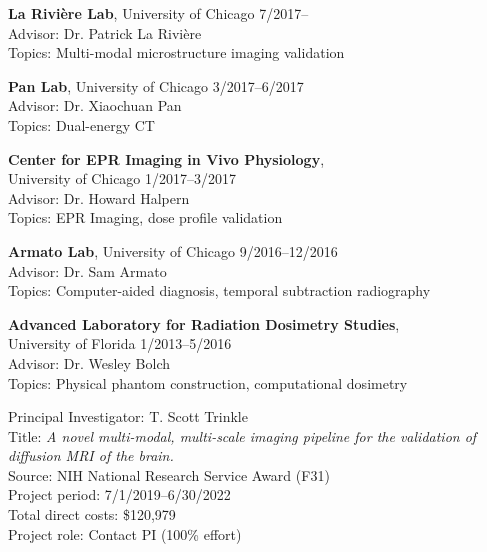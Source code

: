 \documentclass[10pt,letterpaper]{article}
\begin{document}
\begin{benumerate}{5}
\item
  {\textbf{La Rivi\`ere Lab}, University of Chicago} \hfill 7/2017--\\
  Advisor: Dr. Patrick La Rivi\`ere\\
  Topics: Multi-modal microstructure imaging validation
\item
  {\textbf{Pan Lab}, University of Chicago} \hfill 3/2017--6/2017\\
  Advisor: Dr. Xiaochuan Pan\\
  Topics: Dual-energy CT
\item
  {\textbf{Center for EPR Imaging in Vivo Physiology}, \\
    University of Chicago} \hfill 1/2017--3/2017\\
  Advisor: Dr. Howard Halpern\\
  Topics: EPR Imaging, dose profile validation
\item
  {\textbf{Armato Lab}, University of Chicago} \hfill 9/2016--12/2016\\
  Advisor: Dr. Sam Armato\\
  Topics: Computer-aided diagnosis, temporal subtraction radiography
\item
  {\textbf{Advanced Laboratory for Radiation Dosimetry Studies}, \\
    University of Florida} \hfill 1/2013--5/2016\\
  Advisor: Dr. Wesley Bolch\\
  Topics: Physical phantom construction, computational dosimetry
\end{benumerate}

\begin{benumerate}{1}
\item
  Principal Investigator: T. Scott Trinkle\\
  Title: \textit{A novel multi-modal, multi-scale imaging pipeline for the
    validation of diffusion MRI of the brain.}\\
  Source: NIH National Research Service Award (F31)\\
  Project period: 7/1/2019--6/30/2022\\
  Total direct costs: \$120,979\\
  Project role: Contact PI (100\% effort)
\end{benumerate}
\end{document}

